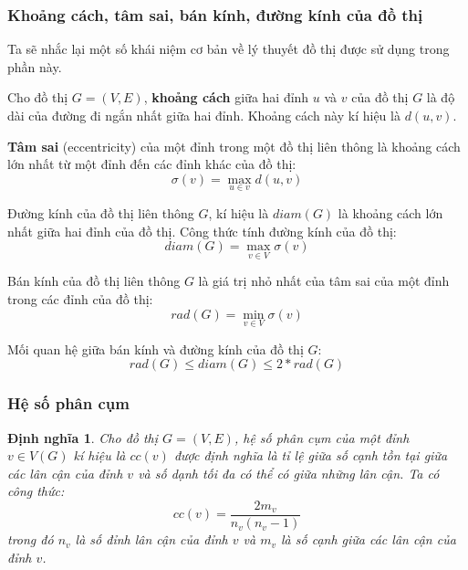 \documentclass[14pt, oneside, a4paper, openany]{scrartcl}
\newtheorem{definition}{Định nghĩa}[section]
\begin{document}
\subsubsection{Khoảng cách, tâm sai, bán kính, đường kính của đồ thị}
Ta sẽ nhắc lại một số khái niệm cơ bản về lý thuyết đồ thị được sử dụng trong phần này.

\cite{graphtextbook} Cho đồ thị $G=(V,E)$, \textbf{khoảng cách}  giữa hai đỉnh $u$ và $v$ của đồ thị $G$ là độ dài của đường đi ngắn nhất giữa hai đỉnh. Khoảng cách này kí hiệu là $d(u,v)$.

\cite{graphtextbook} \textbf{Tâm sai}  (eccentricity) của một đỉnh trong một đồ thị liên thông là khoảng cách lớn nhất từ một đỉnh đến các đỉnh khác của đồ thị:
\begin{equation}
	\sigma(v) = \max_{u \in v} d(u,v)
\end{equation}

\cite{graphtextbook} Đường kính của đồ thị liên thông $G$, kí hiệu là $diam(G)$ là khoảng cách lớn nhất giữa hai đỉnh của đồ thị. Công thức tính đường kính của đồ thị:
\begin{equation}
	diam(G) = \max_{v \in V} \sigma(v)
\end{equation}

\cite{graphtextbook} Bán kính của đồ thị liên thông $G$ là giá trị nhỏ nhất của tâm sai của một đỉnh trong các đỉnh của đồ thị:
\begin{equation}
	rad(G) = \min_{v \in V} \sigma(v)
\end{equation}

\cite{graphtextbook} Mối quan hệ giữa bán kính và đường kính của đồ thị $G$:
\begin{equation}
	rad(G) \leq diam(G) \leq 2 * rad(G)
\end{equation}

\subsubsection{Hệ số phân cụm}
\begin{definition}
	\cite{complexnetwork}Cho đồ thị $G = (V,E)$, hệ số phân cụm  của một đỉnh $v \in V(G)$ kí hiệu là $cc(v)$ được định nghĩa là tỉ lệ giữa số cạnh tồn tại giữa các lân cận của đỉnh $v$ và số dạnh tối đa có thể có giữa những lân cận. Ta có công thức:
	\begin{equation}
		cc(v) = \frac{2m_v}{n_v(n_v-1)}
	\end{equation}
	trong đó $n_v$ là số đỉnh lân cận của đỉnh $v$ và $m_v$ là số cạnh giữa các lân cận của đỉnh $v$.
\end{definition}
\end{document}
